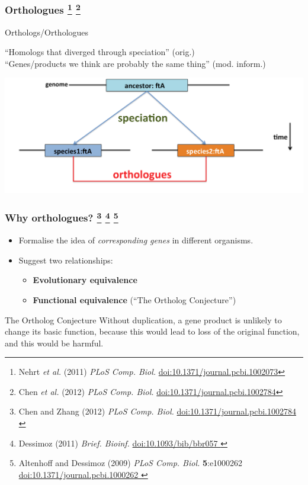 \begin{frame}
  \frametitle{Orthologues
  \footnote{\tiny{Nehrt \textit{et al.} (2011) \textit{PLoS Comp. Biol.} \href{http://dx.doi.org/10.1371/journal.pcbi.1002073}{doi:10.1371/journal.pcbi.1002073}}}  
    \footnote{\tiny{Chen \textit{et al.} (2012) \textit{PLoS Comp. Biol.} \href{http://dx.doi.org/10.1371/journal.pcbi.1002784}{doi:10.1371/journal.pcbi.1002784}}}  
  }
  \begin{alertblock}{Orthologs/Orthologues}
    \begin{small}
    ``Homologs that diverged through speciation'' (orig.) \\
    ``Genes/products we think are probably the same thing'' (mod. inform.)
    \end{small}
  \end{alertblock}  
  \begin{center}
    \includegraphics[width=1\textwidth]{images/logues2}  
  \end{center}  
\end{frame}

\begin{frame}
  \frametitle{Why orthologues?
    \footnote{\tiny{Chen and Zhang (2012) \textit{PLoS Comp. Biol.} \href{http://dx.doi.org/10.1371/journal.pcbi.1002784}{doi:10.1371/journal.pcbi.1002784
    }}}  
    \footnote{\tiny{Dessimoz (2011) \textit{Brief. Bioinf.} \href{http://dx.doi.org/10.1093/bib/bbr057}{doi:10.1093/bib/bbr057
    }}}
    \footnote{\tiny{Altenhoff and Dessimoz (2009) \textit{PLoS Comp. Biol.} \textbf{5}:e1000262 \href{http://dx.doi.org/10.1371/journal.pcbi.1000262}{doi:10.1371/journal.pcbi.1000262
    }}}
  }
  \begin{itemize}
    \item Formalise the idea of \textit{corresponding genes} in different organisms.
    \item \textcolor{hutton_blue}{Suggest two relationships:}
      \begin{itemize}
        \item \textcolor{hutton_green}{\textbf{Evolutionary equivalence}}
        \item \textcolor{hutton_purple}{\textbf{Functional equivalence}} (``The Ortholog Conjecture'')
      \end{itemize}
   \end{itemize}
   \begin{alertblock}{The Ortholog Conjecture}
     Without duplication, a gene product is unlikely to change its basic function, because this would lead to loss of the original function, and this would be harmful.
   \end{alertblock}
\end{frame}


